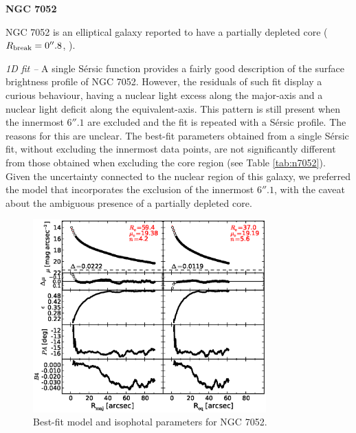\documentclass[preprint2]{emulateapj}
\newcommand{\fitfigurewidth}{0.8\textwidth}
\begin{document}
  \clearpage\newpage\noindent
  {\bf NGC 7052 \\}

  NGC 7052 is an elliptical galaxy reported to have a partially depleted core 
  ($R_{\rm break} = 0''.8$, \citealt{quillen2000}). 


  \emph{1D fit -- }
  A single S\'ersic function provides a fairly good description of the surface brightness profile of NGC 7052.
  However, the residuals of such fit display a curious behaviour, having a nuclear light excess along the major-axis 
  and a nuclear light deficit along the equivalent-axis. 
  This pattern is still present when the innermost $6''.1$ are excluded and the fit is repeated with a S\'ersic profile.
  The reasons for this are unclear. 
  The best-fit parameters obtained from a single S\'ersic fit, without excluding the innermost data points,
  are not significantly different from those obtained when excluding the core region (see Table \ref{tab:n7052}).
  Given the uncertainty connected to the nuclear region of this galaxy,
  we preferred the model that incorporates the exclusion of the innermost $6''.1$, 
  with the caveat about the ambiguous presence of a partially depleted core.

  \begin{figure}[h]
  \begin{center}
  \includegraphics[width=\fitfigurewidth]{images/n7052_1Dfit.eps}
  \caption{Best-fit model and isophotal parameters for NGC 7052.}
  \end{center}
  \end{figure}
\end{document}
